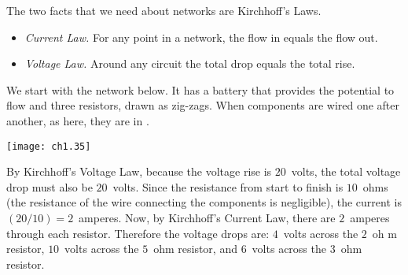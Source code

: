 The two facts that we need about networks are Kirchhoff's
Laws. 
\begin{itemize}
  \item[] \textit{Current Law.} For any point in a network, the flow in
     equals the flow out.
  \item[] \textit{Voltage Law.} Around any circuit the total drop equals 
     the total rise.
\end{itemize}

We start with the network below.
It has a battery that provides the potential to flow 
and three resistors, drawn as zig-zags.
When components are wired one after another, as here,
they are in .
\begin{center}
  \texttt{[image: ch1.35]}
\end{center}
By Kirchhoff's Voltage Law, because the voltage rise is
$20$~volts, the total voltage drop must also be $20$~volts.
Since the resistance from start to finish is
$10$~ohms (the resistance of the wire connecting the components is negligible),
the current is $(20/10)=2$~amperes. 
Now, by Kirchhoff's Current Law, there are $2$~amperes through
each resistor.
Therefore the voltage drops are: 
$4$~volts across the $2$~oh m resistor,
$10$~volts across the $5$~ohm resistor, 
and $6$~volts across the $3$~ohm resistor.

